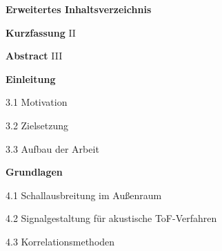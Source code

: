 \documentclass[a4paper,12pt,headsepline]{scrartcl}
\begin{document}







\onehalfspacing

\newpage

\thispagestyle{empty}


\singlespacing

\newpage
\setcounter{page}{1}

\thispagestyle{empty}
\vspace*{1.5cm}
\begin{center}
{\Large \textbf{Erweitertes Inhaltsverzeichnis}}
\end{center}

\vspace{2cm}
\noindent
\textbf{Kurzfassung} \dotfill II

\noindent
\textbf{Abstract} \dotfill III

\vspace{0.5cm}
\noindent
\textbf{Einleitung} 

\noindent
\hspace{1cm} 3.1 Motivation 

\noindent
\hspace{1cm} 3.2 Zielsetzung 

\noindent
\hspace{1cm} 3.3 Aufbau der Arbeit 

\vspace{0.5cm}
\noindent
\textbf{Grundlagen} 

\noindent
\hspace{1cm} 4.1 Schallausbreitung im Außenraum 

\noindent
\hspace{1cm} 4.2 Signalgestaltung für akustische ToF-Verfahren 

\noindent
\hspace{1cm} 4.3 Korrelationsmethoden 
\end{document}

